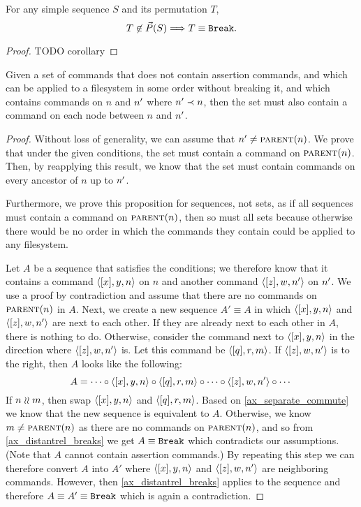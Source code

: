 \begin{mylem}\label{order_is_only_possible}
For any simple sequence $S$ and its permutation $T$, 
\[ T\not\in\vec{P}({S}) \Longrightarrow T\equiv\mathtt{Break}. \]
\end{mylem}
\begin{proof}
TODO corollary
\end{proof}



\begin{mylem}\label{connected_changes}
Given a set of commands that
does not contain assertion commands,
and which can be applied to a filesystem in some order without breaking it,
and which contains commands on $n$ and $n'$ where $n'\prec n$,
then the set must also contain a command
on each node between $n$ and $n'$.
\end{mylem}
\begin{proof}
Without loss of generality, we can assume that $n'\neq\text{\normalfont\scshape{parent}}(n)$.
We prove that under the given conditions, the set must contain a command on $\text{\normalfont\scshape{parent}}(n)$.
Then, by reapplying this result, we know that the set must contain commands on every
ancestor of $n$ up to $n'$.

Furthermore,
we prove this proposition for sequences, not sets, as if all sequences must contain a command on $\text{\normalfont\scshape{parent}}(n)$,
then so must all sets because otherwise there would be no order in which the commands they contain could be
applied to any filesystem.

Let $A$ be a sequence that satisfies the conditions;
we therefore know that it contains a command $\langle{[x],y,n}\rangle$ on $n$
and another command $\langle{[z],w,n'}\rangle$ on $n'$.
We use a proof by contradiction and assume that there are no commands on $\text{\normalfont\scshape{parent}}(n)$ in $A$.
Next, we create a new sequence $A'\equiv A$ in which $\langle{[x],y,n}\rangle$ and $\langle{[z],w,n'}\rangle$ are next to each other.
If they are already next to each other in $A$, there is nothing to do.
Otherwise, consider the command next to $\langle{[x],y,n}\rangle$ in the direction where $\langle{[z],w,n'}\rangle$ is.
Let this command be $\langle{[q],r,m}\rangle$.
If $\langle{[z],w,n'}\rangle$ is to the right, then $A$ looks like the following:
\[ A = \cdots\circ\langle{[x],y,n}\rangle\circ\langle{[q],r,m}\rangle\circ\cdots\circ\langle{[z],w,n'}\rangle\circ\cdots \]
If $n\mathrel{\wr\wr} m$, then swap $\langle{[x],y,n}\rangle$ and $\langle{[q],r,m}\rangle$. Based on \cref{ax_separate_commute} we know that the new
sequence is equivalent to $A$.
Otherwise, we know $m\neq\text{\normalfont\scshape{parent}}(n)$ as there are no commands on $\text{\normalfont\scshape{parent}}(n)$, and so
from \cref{ax_distantrel_breaks} we get $A\equiv\mathtt{Break}$ which contradicts our assumptions.
(Note that $A$ cannot contain assertion commands.)
By repeating this step we can therefore convert $A$ into $A'$ where $\langle{[x],y,n}\rangle$ and $\langle{[z],w,n'}\rangle$ are neighboring commands.
However, then \cref{ax_distantrel_breaks} applies to the sequence and therefore $A\equiv A'\equiv\mathtt{Break}$ which
is again a contradiction.
\end{proof}



